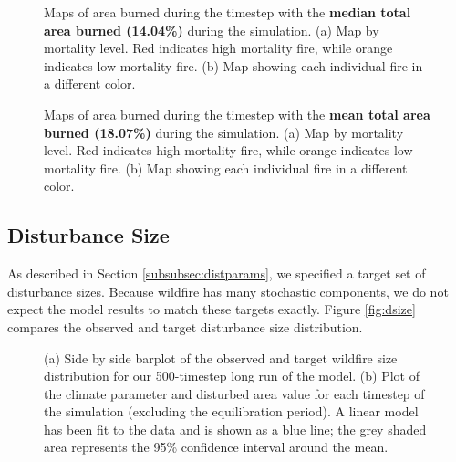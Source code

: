 \begin{figure}[!htbp]
  \centering
  \caption{Maps of area burned during the timestep with the \textbf{median total area burned (14.04\%)} during the simulation. (a) Map by mortality level. Red indicates high mortality fire, while orange indicates low mortality fire. (b) Map showing each individual fire in a different color.}
  \label{fig:darea_median_map}
\end{figure}

\begin{figure}[!htbp]
  \centering
  \caption{Maps of area burned during the timestep with the \textbf{mean total area burned (18.07\%)} during the simulation. (a) Map by mortality level. Red indicates high mortality fire, while orange indicates low mortality fire. (b) Map showing each individual fire in a different color.}
  \label{fig:darea_mean_map}
\end{figure}

\clearpage

\subsection{Disturbance Size} 
As described in Section \ref{subsubsec:distparams}, we specified a target set of disturbance sizes. Because wildfire has many stochastic components, we do not expect the model results to match these targets exactly. Figure \ref{fig:dsize} compares the observed and target disturbance size distribution.

\begin{figure}[!htbp]
  \centering
  \qquad
  \caption{(a) Side by side barplot of the observed and target wildfire size distribution for our 500-timestep long run of the model. (b) Plot of the climate parameter and disturbed area value for each timestep of the simulation (excluding the  equilibration period). A linear model has been fit to the data and is shown as a blue line; the grey shaded area represents  the 95\% confidence interval around the mean.}
  \label{fig:climate_disturbance}
\end{figure}



